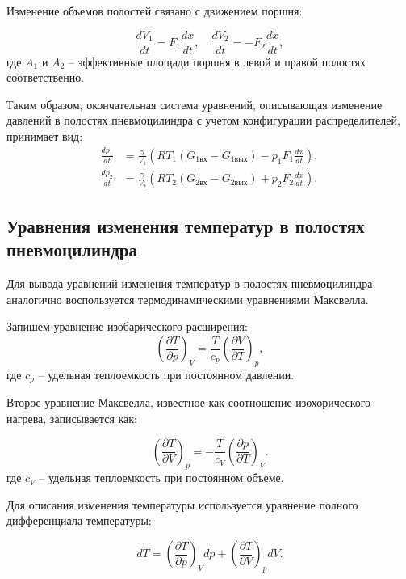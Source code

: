 Изменение объемов полостей связано с движением поршня:

\begin{equation*}
    \frac{dV_1}{dt} = F_1\frac{dx}{dt}, \quad \frac{dV_2}{dt} = -F_2\frac{dx}{dt},
\end{equation*}
где $A_1$ и $A_2$ -- эффективные площади поршня в левой и правой полостях соответственно.

Таким образом, окончательная система уравнений, описывающая изменение
давлений в полостях пневмоцилиндра с учетом конфигурации распределителей, принимает вид:
\begin{equation}
    \begin{aligned}
        \frac{dp_1}{dt} & = \frac{\gamma}{V_1}\left(RT_1(G_{1\text{вх}} - G_{1\text{вых}}) - p_1 F_1\frac{dx}{dt}\right), \\
        \frac{dp_2}{dt} & = \frac{\gamma}{V_2}\left(RT_2(G_{2\text{вх}} - G_{2\text{вых}}) + p_2 F_2\frac{dx}{dt}\right).
    \end{aligned}
\end{equation}

\subsection{Уравнения изменения температур в полостях пневмоцилиндра}\label{sec:ch2/sec2/subsec3}

Для вывода уравнений изменения температур в полостях пневмоцилиндра аналогично воспользуется
термодинамическими уравнениями Максвелла.

Запишем уравнение изобарического расширения:
\begin{equation*}
    \left(\frac{\partial T}{\partial p}\right)_V = \frac{T}{c_p} \left(\frac{\partial V}{\partial T}\right)_p,
\end{equation*}
где  $c_p$ -- удельная теплоемкость при постоянном давлении.

Второе уравнение Максвелла, известное как соотношение изохорического нагрева, записывается как:

\begin{equation*}
    \left(\frac{\partial T}{\partial V}\right)_p = -\frac{T}{c_V} \left(\frac{\partial p}{\partial T}\right)_V.
\end{equation*}
где $c_V$ -- удельная теплоемкость при постоянном объеме.

Для описания изменения температуры используется уравнение полного дифференциала температуры:

\begin{equation*}
    dT = \left(\frac{\partial T}{\partial p}\right)_V dp + \left(\frac{\partial T}{\partial V}\right)_p dV.
\end{equation*}

